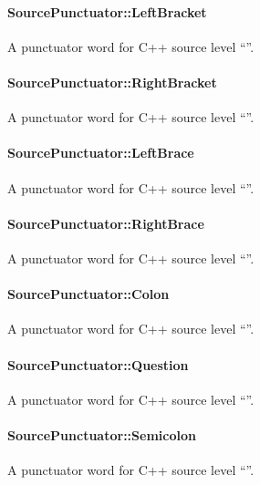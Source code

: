 \paragraph{SourcePunctuator::LeftBracket}
\label{sec:ifc:SourcePunctuator:LeftBracket}

A punctuator word for C++ source level ``\code{[}''.

\paragraph{SourcePunctuator::RightBracket}
\label{sec:ifc:SourcePunctuator:RightBracket}

A punctuator word for C++ source level ``\code{]}''.

\paragraph{SourcePunctuator::LeftBrace}
\label{sec:ifc:SourcePunctuator:LeftBrace}

A punctuator word for C++ source level ``\code{\{}''.

\paragraph{SourcePunctuator::RightBrace}
\label{sec:ifc:SourcePunctuator:RightBrace}

A punctuator word for C++ source level ``\code{\}}''.

\paragraph{SourcePunctuator::Colon}
\label{sec:ifc:SourcePunctuator:Colon}

A punctuator word for C++ source level ``\code{:}''.

\paragraph{SourcePunctuator::Question}
\label{sec:ifc:SourcePunctuator:Question}

A punctuator word for C++ source level ``''.

\paragraph{SourcePunctuator::Semicolon}
\label{sec:ifc:SourcePunctuator:Semicolon}

A punctuator word for C++ source level ``\code{;}''.

